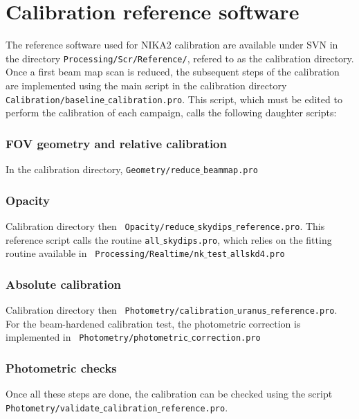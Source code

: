 \section{Calibration reference software}

The reference software used for NIKA2 calibration are available under
SVN in the directory {\tt Processing/Scr/Reference/}, refered to as
the calibration directory. Once a first beam map scan is reduced, the
subsequent steps of the calibration are implemented using the main
script in the calibration directory 
{\tt Calibration/baseline$\_$calibration.pro}. 
This script, which must be edited to perform the calibration of each
campaign, calls the following daughter scripts:


\subsubsection*{FOV geometry and relative calibration}
In the calibration directory, {\tt Geometry/reduce$\_$beammap.pro}

\subsubsection*{Opacity}
Calibration directory then {\tt
  Opacity/reduce$\_$skydips$\_$reference.pro}.
This reference script calls the routine {\tt all$\_$skydips.pro}, which relies on
the fitting routine available in {\tt
  Processing/Realtime/nk$\_$test$\_$allskd4.pro}

\subsubsection*{Absolute calibration}
Calibration directory then {\tt
  Photometry/calibration$\_$uranus$\_$reference.pro}.
For the beam-hardened calibration test, the photometric
correction is implemented in {\tt
  Photometry/photometric$\_$correction.pro}



\subsubsection*{Photometric checks}
Once all these steps are done, the calibration can be checked using
the script {\tt Photometry/validate$\_$calibration$\_$reference.pro}.
